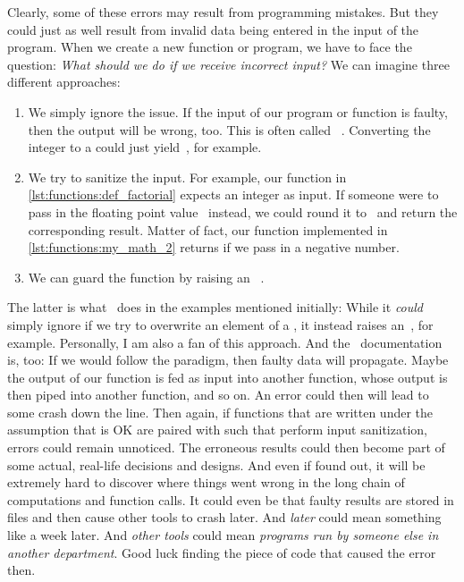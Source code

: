 Clearly, some of these errors may result from programming mistakes.
But they could just as well result from invalid data being entered in the input of the program.%
%
%
When we create a new function or program, we have to face the question:
\emph{What should we do if we receive incorrect input?}
We can imagine three different approaches:%
%
\begin{enumerate}%
%
\item We simply ignore the issue.
If the input of our program or function is faulty, then the output will be wrong, too.
This is often called ~\cite{PKBCBR2005GIGOAELAOMBEUP}.
Converting the integer  to a  could just yield~, for example.%
%
\item We try to sanitize the input.
For example, our  function in \cref{lst:functions:def_factorial} expects an integer as input.
If someone were to pass in the floating point value~ instead, we could round it to~ and return the corresponding result.
Matter of fact, our  function implemented in \cref{lst:functions:my_math_2} returns  if we pass in a negative number.%
%
\item We can guard the function by raising an ~\cite{MAGTOC2024EHFAP,SF2013ASROSR,GRRX2001ACSOEHMFBDOOS}.%
%
\end{enumerate}%
%
The latter is what \python\ does in the examples mentioned initially:
While it \emph{could} simply ignore if we try to overwrite an element of a , it instead raises an~, for example.
Personally, I am also a fan of this approach.
And the \python\ documentation is, too:%
%
%
%
If we would follow the  paradigm, then faulty data will propagate.
Maybe the output of our function is fed as input into another function, whose output is then piped into another function, and so on.
An error could then will lead to some crash down the line.
Then again, if functions that are written under the assumption that  is OK are paired with such that perform input sanitization, errors could remain unnoticed.
The erroneous results could then become part of some actual, real-life decisions and designs.
And even if found out, it will be extremely hard to discover where things went wrong in the long chain of computations and function calls.
It could even be that faulty results are stored in files and then cause other tools to crash later.
And \emph{later} could mean something like a week later.
And \emph{other tools} could mean \emph{programs run by someone else in another department}.
Good luck finding the piece of code that caused the error then.

